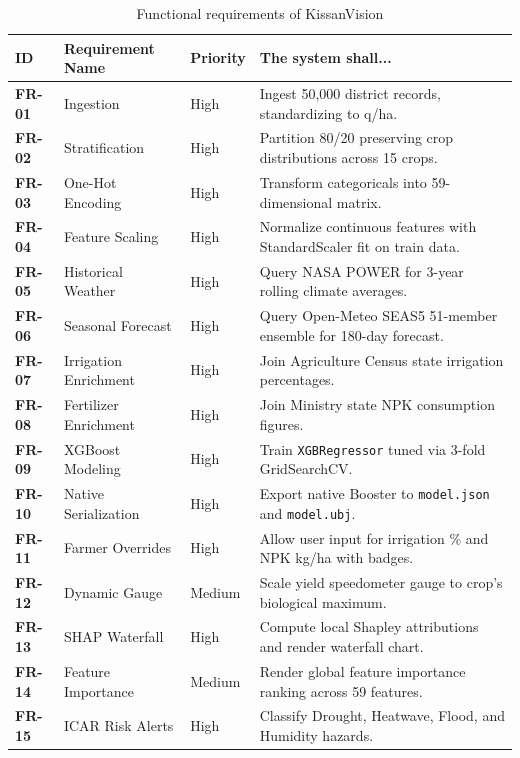 \documentclass[11pt,a4paper]{report}
\begin{document}
\begin{table}[htbp]
\centering
\small
\caption{Functional requirements of KissanVision}
\begin{tabularx}{\textwidth}{lXlX}
\toprule
\textbf{ID} & \textbf{Requirement Name} & \textbf{Priority} & \textbf{The system shall...} \\
\midrule
\textbf{FR-01} & Ingestion & High & Ingest 50,000 district records, standardizing to q/ha. \\
\textbf{FR-02} & Stratification & High & Partition 80/20 preserving crop distributions across 15 crops. \\
\textbf{FR-03} & One-Hot Encoding & High & Transform categoricals into 59-dimensional matrix. \\
\textbf{FR-04} & Feature Scaling & High & Normalize continuous features with StandardScaler fit on train data. \\
\textbf{FR-05} & Historical Weather & High & Query NASA POWER for 3-year rolling climate averages. \\
\textbf{FR-06} & Seasonal Forecast & High & Query Open-Meteo SEAS5 51-member ensemble for 180-day forecast. \\
\textbf{FR-07} & Irrigation Enrichment & High & Join Agriculture Census state irrigation percentages. \\
\textbf{FR-08} & Fertilizer Enrichment & High & Join Ministry state NPK consumption figures. \\
\textbf{FR-09} & XGBoost Modeling & High & Train \texttt{XGBRegressor} tuned via 3-fold GridSearchCV. \\
\textbf{FR-10} & Native Serialization & High & Export native Booster to \texttt{model.json} and \texttt{model.ubj}. \\
\textbf{FR-11} & Farmer Overrides & High & Allow user input for irrigation \% and NPK kg/ha with badges. \\
\textbf{FR-12} & Dynamic Gauge & Medium & Scale yield speedometer gauge to crop's biological maximum. \\
\textbf{FR-13} & SHAP Waterfall & High & Compute local Shapley attributions and render waterfall chart. \\
\textbf{FR-14} & Feature Importance & Medium & Render global feature importance ranking across 59 features. \\
\textbf{FR-15} & ICAR Risk Alerts & High & Classify Drought, Heatwave, Flood, and Humidity hazards. \\
\bottomrule
\end{tabularx}
\end{table}
\end{document}
